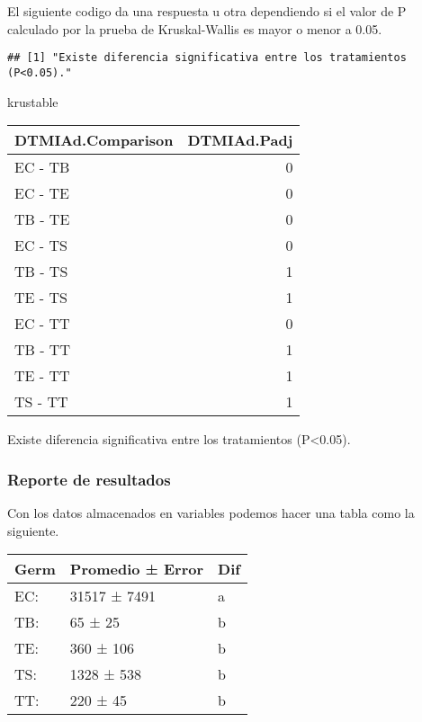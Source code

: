 \documentclass[]{article}
\newenvironment{Shaded}{\begin{snugshade}}{\end{snugshade}}
\newcommand{\ControlFlowTok}[1]{\textcolor[rgb]{0.13,0.29,0.53}{\textbf{#1}}}
\newcommand{\DecValTok}[1]{\textcolor[rgb]{0.00,0.00,0.81}{#1}}
\newcommand{\FloatTok}[1]{\textcolor[rgb]{0.00,0.00,0.81}{#1}}
\newcommand{\KeywordTok}[1]{\textcolor[rgb]{0.13,0.29,0.53}{\textbf{#1}}}
\newcommand{\NormalTok}[1]{#1}
\newcommand{\OperatorTok}[1]{\textcolor[rgb]{0.81,0.36,0.00}{\textbf{#1}}}
\newcommand{\StringTok}[1]{\textcolor[rgb]{0.31,0.60,0.02}{#1}}
\begin{document}
El siguiente codigo da una respuesta u otra dependiendo si el valor de P
calculado por la prueba de Kruskal-Wallis es mayor o menor a 0.05.

\begin{Shaded}
\end{Shaded}

\begin{verbatim}
## [1] "Existe diferencia significativa entre los tratamientos (P<0.05)."
\end{verbatim}

\begin{Shaded}
\begin{Highlighting}[]
\NormalTok{krustable}
\end{Highlighting}
\end{Shaded}

\begin{longtable}[]{@{}lr@{}}
\toprule
DTMIAd.Comparison & DTMIAd.Padj\tabularnewline
\midrule
\endhead
EC - TB & 0\tabularnewline
EC - TE & 0\tabularnewline
TB - TE & 0\tabularnewline
EC - TS & 0\tabularnewline
TB - TS & 1\tabularnewline
TE - TS & 1\tabularnewline
EC - TT & 0\tabularnewline
TB - TT & 1\tabularnewline
TE - TT & 1\tabularnewline
TS - TT & 1\tabularnewline
\bottomrule
\end{longtable}

Existe diferencia significativa entre los tratamientos
(P\textless{}0.05).

\hypertarget{reporte-de-resultados}{%
\subsubsection{Reporte de resultados}\label{reporte-de-resultados}}

Con los datos almacenados en variables podemos hacer una tabla como la
siguiente.

\begin{longtable}[]{@{}lll@{}}
\toprule
Germ & Promedio ± Error & Dif\tabularnewline
\midrule
\endhead
EC: & 31517 ± 7491 & a\tabularnewline
TB: & 65 ± 25 & b\tabularnewline
TE: & 360 ± 106 & b\tabularnewline
TS: & 1328 ± 538 & b\tabularnewline
TT: & 220 ± 45 & b\tabularnewline
\bottomrule
\end{longtable}
\end{document}
